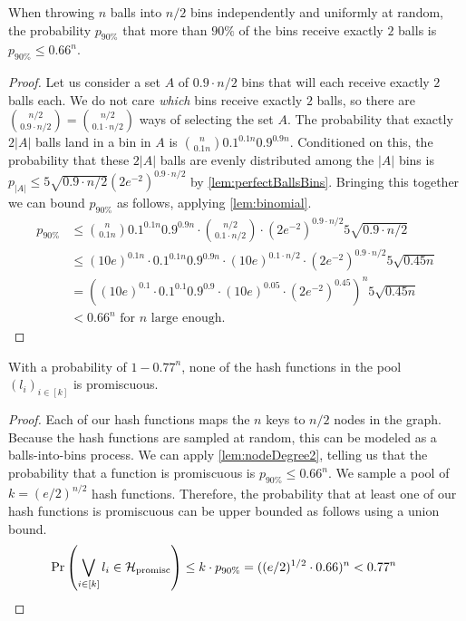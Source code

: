 \documentclass[a4paper,USenglish,cleveref]{lipics-v2021}
\begin{document}
\begin{lemma}
  When throwing $n$ balls into $n/2$ bins independently and uniformly at random, the probability $p_{90\%}$ that more than $90\%$ of the bins receive exactly $2$ balls is $p_{90\%} \leq 0.66^n$.
  \label{lem:nodeDegree2}
\end{lemma}
\begin{proof}
  Let us consider a set $A$ of $0.9 \cdot n/2$ bins that will each receive exactly $2$ balls each.
  We do not care \emph{which} bins receive exactly $2$ balls, so there are ${n/2 \choose 0.9 \cdot n/2} = {n/2 \choose 0.1 \cdot n/2}$ ways of selecting the set $A$.
  The probability that exactly $2|A|$ balls land in a bin in $A$ is ${n \choose 0.1n} 0.1^{0.1n} 0.9^{0.9n}$.
  Conditioned on this, the probability that these $2|A|$ balls are evenly distributed among the $|A|$ bins is $p_{|A|} \leq 5 \sqrt{0.9 \cdot n/2} \left(2e^{-2}\right)^{0.9 \cdot n/2}$ by \cref{lem:perfectBallsBins}.
  Bringing this together we can bound $p_{90\%}$ as follows, applying \cref{lem:binomial}.
  \begin{align*}
    p_{90\%}
      &\leq {n \choose 0.1n} 0.1^{0.1n} 0.9^{0.9n} \cdot {n/2 \choose 0.1 \cdot n/2} \cdot \left(2e^{-2}\right)^{0.9 \cdot n/2} 5 \sqrt{0.9 \cdot n/2} \\
      &\leq (10e)^{0.1n} \cdot 0.1^{0.1n} 0.9^{0.9n} \cdot (10e)^{0.1\cdot n/2} \cdot \left(2e^{-2}\right)^{0.9 \cdot n/2} 5 \sqrt{0.45n}  \\
      &= \left((10e)^{0.1} \cdot 0.1^{0.1} 0.9^{0.9} \cdot (10e)^{0.05} \cdot \left(2e^{-2}\right)^{0.45} \right)^{n} 5 \sqrt{0.45n}\\
      &< 0.66^{n} \textrm{ for $n$ large enough.}
    \tag*{\qedhere}
  \end{align*}
\end{proof}

\begin{lemma}
  With a probability of $1 - 0.77^n$, none of the hash functions in the pool $(l_i)_{i\in[k]}$ is promiscuous.
  \label{lem:eventPoolNodeDegree2}
\end{lemma}
\begin{proof}
  Each of our hash functions maps the $n$ keys to $n/2$ nodes in the graph.
  Because the hash functions are sampled at random, this can be modeled as a balls-into-bins process.
  We can apply \cref{lem:nodeDegree2}, telling us that the probability that a function is promiscuous is $p_{90\%} \leq 0.66^n$.
  We sample a pool of $k=(e/2)^{n/2}$ hash functions.
  Therefore, the probability that at least one of our hash functions is promiscuous can be upper bounded as follows using a union bound.
  \begin{align*}
    \Pr\left(\bigvee_{i\in[k]} l_i \in \mathcal{H}_{\textrm{promisc}}\right)
      \leq k \cdot p_{90\%}
      = ((e/2)^{1/2} \cdot 0.66)^n
      < 0.77^n
    \tag*{\qedhere}
  \end{align*}
\end{proof}
\end{document}
